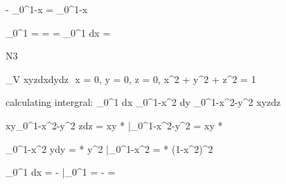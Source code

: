 \documentclass{article}
\begin{document}
- \int_0^{1-x}  = \int_0^{1-x}  \newline
\vspace*{\baselineskip}

\int_0^1  =  =  =  \int_0^1 dx =  \newline

\vspace*{\baselineskip}
\vspace*{\baselineskip}
\vspace*{\baselineskip}
\vspace*{\baselineskip}


N3

\iiint\limits_V  xyzdxdydz \hspace{50}$$ x = 0, y = 0, z = 0, x^2 + y^2 + z^2 = 1 \newline
\vspace*{\baselineskip}


calculating intergral: \int_0^{1} dx \int_0^{1-x^2} dy \int_0^{1-x^2-y^2} xyzdz \newline
\vspace*{\baselineskip}

xy\int_0^{1-x^2-y^2} zdz = xy *  \Bigg|_{0}^{1-x^2-y^2} = xy *  \newline
\vspace*{\baselineskip}

\int_0^{1-x^2}  ydy =  * y^2 \Bigg|_{0}^{1-x^2} =  * (1-x^2)^2 \newline
\vspace*{\baselineskip}


\int_0^1  dx = -  \Bigg|_{0}^{1} = -  = 
\end{document}

